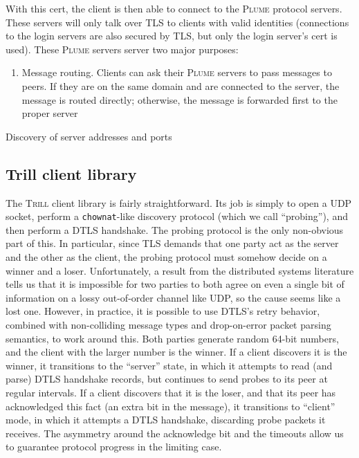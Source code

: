 \documentclass[11pt]{article}
\newcommand{\Trill}{\textsc{Trill}\xspace}
\newcommand{\Plume}{\textsc{Plume}\xspace}
\begin{document}
With this cert, the client is then able to connect to the \Plume protocol
servers.  These servers will only talk over TLS to clients with valid
identities (connections to the login servers are also secured by TLS, but only
the login server's cert is used).  These \Plume servers server two major
purposes:

\begin{enumerate}
  \item Message routing.  Clients can ask their \Plume servers to pass messages
    to peers.  If they are on the same domain and are connected to the server,
    the message is routed directly; otherwise, the message is forwarded first
    to the proper server
\end{enumerate}

Discovery of server addresses and ports

\subsection{Trill client library}
The \Trill client library is fairly straightforward. Its job is simply to open a
UDP socket, perform a \verb`chownat`-like discovery protocol (which we call
``probing''), and then perform a DTLS handshake. The probing protocol is the
only non-obvious part of this. In particular, since TLS demands that one party
act as the server and the other as the client, the probing protocol must somehow
decide on a winner and a loser. Unfortunately, a result from the distributed
systems literature tells us that it is impossible for two parties to both agree
on even a single bit of information on a lossy out-of-order channel like UDP, so
the cause seems like a lost one. However, in practice, it is possible to use
DTLS's retry behavior, combined with non-colliding message types and
drop-on-error packet parsing semantics, to work around this. Both parties
generate random 64-bit numbers, and the client with the larger number is the
winner. If a client discovers it is the winner, it transitions to the ``server''
state, in which it attempts to read (and parse) DTLS handshake records, but
continues to send probes to its peer at regular intervals. If a client discovers
that it is the loser, and that its peer has acknowledged this fact (an extra bit
in the message), it transitions to ``client'' mode, in which it attempts a DTLS
handshake, discarding probe packets it receives. The asymmetry around the
acknowledge bit and the timeouts allow us to guarantee protocol progress in the
limiting case.
\end{document}
